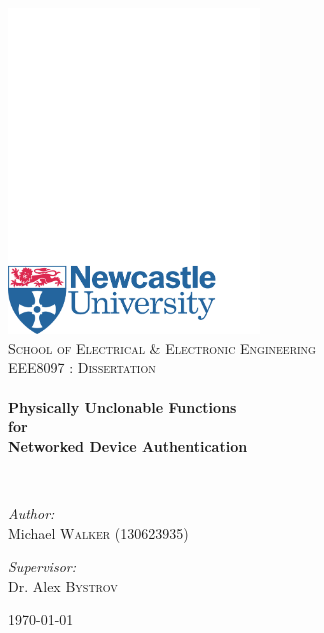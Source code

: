\begin{titlepage}
\begin{center}

\includegraphics[width=0.5\textwidth, trim=0 0 0 600, clip]{images/newcastlelogo}~\\[1cm]
\textsc{\large School of Electrical \& Electronic Engineering}\\[1cm]

\textsc{\large EEE8097 : Dissertation}\\[0.5cm]

\HRule \\[0.4cm]
{ \LARGE \bfseries
Physically Unclonable Functions \\
for \\
Networked Device Authentication \\[0.4cm] }

\HRule \\[1.5cm]

\begin{minipage}{0.55\textwidth}
\begin{flushleft} \large
\emph{Author:}\\[0.2cm]
Michael \textsc{Walker} (130623935)
\end{flushleft}
\end{minipage}
\begin{minipage}{0.35\textwidth}
\begin{flushright} \large
\emph{Supervisor:} \\[0.2cm]
Dr. Alex \textsc{Bystrov}
\end{flushright}




\end{minipage}

\vfill

{\large \today}
\end{center}
\end{titlepage}
